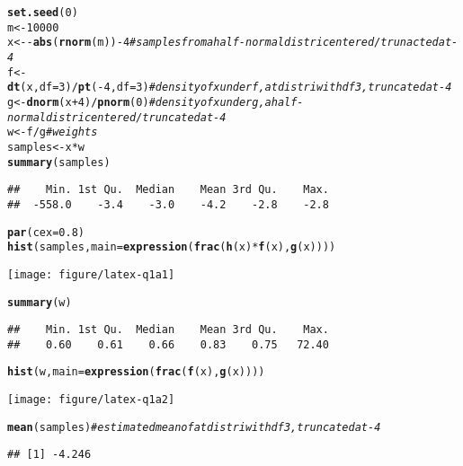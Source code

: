 \documentclass{article}\usepackage[]{graphicx}\usepackage[]{color}
\makeatletter
\def\maxwidth{ %
  \ifdim\Gin@nat@width>\linewidth
    \linewidth
  \else
    \Gin@nat@width
  \fi
}
\newcommand{\hlnum}[1]{\textcolor[rgb]{0.686,0.059,0.569}{#1}}%
\newcommand{\hlcom}[1]{\textcolor[rgb]{0.678,0.584,0.686}{\textit{#1}}}%
\newcommand{\hlopt}[1]{\textcolor[rgb]{0,0,0}{#1}}%
\newcommand{\hlstd}[1]{\textcolor[rgb]{0.345,0.345,0.345}{#1}}%
\newcommand{\hlkwb}[1]{\textcolor[rgb]{0.69,0.353,0.396}{#1}}%
\newcommand{\hlkwc}[1]{\textcolor[rgb]{0.333,0.667,0.333}{#1}}%
\newcommand{\hlkwd}[1]{\textcolor[rgb]{0.737,0.353,0.396}{\textbf{#1}}}%
\newenvironment{kframe}{%
 \def\at@end@of@kframe{}%
 \ifinner\ifhmode%
  \def\at@end@of@kframe{\end{minipage}}%
  \begin{minipage}{\columnwidth}%
 \fi\fi%
 \def\FrameCommand##1{\hskip\@totalleftmargin \hskip-\fboxsep
 \colorbox{shadecolor}{##1}\hskip-\fboxsep
     \hskip-\linewidth \hskip-\@totalleftmargin \hskip\columnwidth}%
 \MakeFramed {\advance\hsize-\width
   \@totalleftmargin\z@ \linewidth\hsize
   \@setminipage}}%
 {\par\unskip\endMakeFramed%
 \at@end@of@kframe}
\newenvironment{knitrout}{}{} %
\makeatother
\begin{document}
\begin{knitrout}
\color{fgcolor}\begin{kframe}
\begin{alltt}
\hlkwd{set.seed}\hlstd{(}\hlnum{0}\hlstd{)}
\hlstd{m} \hlkwb{<-} \hlnum{10000}
\hlstd{x} \hlkwb{<-} \hlopt{-} \hlkwd{abs}\hlstd{(}\hlkwd{rnorm}\hlstd{(m))} \hlopt{-} \hlnum{4} \hlcom{# samples from a half-normal distri centered/trunacted at -4}
\hlstd{f} \hlkwb{<-} \hlkwd{dt}\hlstd{(x,} \hlkwc{df} \hlstd{=} \hlnum{3}\hlstd{)}\hlopt{/}\hlkwd{pt}\hlstd{(}\hlopt{-}\hlnum{4}\hlstd{,} \hlkwc{df} \hlstd{=} \hlnum{3}\hlstd{)}  \hlcom{# density of x under f, a t distri with df 3, truncated at -4}
\hlstd{g} \hlkwb{<-} \hlkwd{dnorm}\hlstd{(x} \hlopt{+} \hlnum{4}\hlstd{)}\hlopt{/}\hlkwd{pnorm}\hlstd{(}\hlnum{0}\hlstd{)}  \hlcom{# density of x under g, a half-normal distri centered/truncated at -4}
\hlstd{w} \hlkwb{<-} \hlstd{f}\hlopt{/}\hlstd{g} \hlcom{# weights}
\hlstd{samples} \hlkwb{<-} \hlstd{x}\hlopt{*}\hlstd{w}
\hlkwd{summary}\hlstd{(samples)}
\end{alltt}
\begin{verbatim}
##    Min. 1st Qu.  Median    Mean 3rd Qu.    Max. 
##  -558.0    -3.4    -3.0    -4.2    -2.8    -2.8
\end{verbatim}
\begin{alltt}
\hlkwd{par}\hlstd{(}\hlkwc{cex} \hlstd{=} \hlnum{0.8}\hlstd{)}
\hlkwd{hist}\hlstd{(samples,} \hlkwc{main} \hlstd{=} \hlkwd{expression}\hlstd{(}\hlkwd{frac}\hlstd{(}\hlkwd{h}\hlstd{(x)}\hlopt{*}\hlkwd{f}\hlstd{(x),} \hlkwd{g}\hlstd{(x))))}
\end{alltt}
\end{kframe}
\texttt{[image: figure/latex-q1a1]} 
\begin{kframe}\begin{alltt}
\hlkwd{summary}\hlstd{(w)}
\end{alltt}
\begin{verbatim}
##    Min. 1st Qu.  Median    Mean 3rd Qu.    Max. 
##    0.60    0.61    0.66    0.83    0.75   72.40
\end{verbatim}
\begin{alltt}
\hlkwd{hist}\hlstd{(w,} \hlkwc{main} \hlstd{=} \hlkwd{expression}\hlstd{(}\hlkwd{frac}\hlstd{(}\hlkwd{f}\hlstd{(x),}\hlkwd{g}\hlstd{(x))))}
\end{alltt}
\end{kframe}
\texttt{[image: figure/latex-q1a2]} 
\begin{kframe}\begin{alltt}
\hlkwd{mean}\hlstd{(samples)} \hlcom{# estimated mean of a t distri with df 3, truncated at -4}
\end{alltt}
\begin{verbatim}
## [1] -4.246
\end{verbatim}
\end{kframe}
\end{knitrout}
\end{document}
